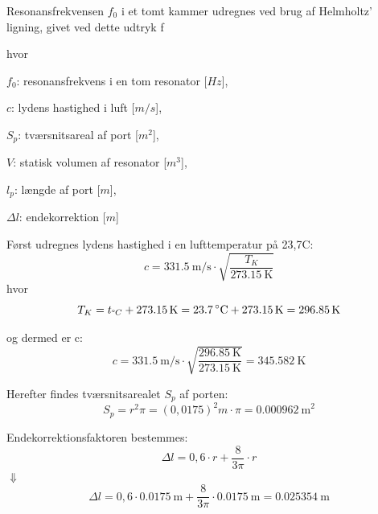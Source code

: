 {Resonansfrekvensen $f_{0}$ i et tomt kammer udregnes ved brug af Helmholtz' ligning, givet ved dette udtryk f

hvor 
\begin{description}[align=left,labelindent=0.3cm]
\item $f_{0}$: resonansfrekvens i en tom resonator [$Hz$],\\
\item $c$: lydens hastighed i luft [$m/s$],\\
\item $S_{p}$: tværsnitsareal af port [$m^2$],\\
\item $V$: statisk volumen af resonator [$m^3$],\\
\item $l_{p}$: længde af port [$m$],\\
\item $\Delta l$: endekorrektion [$m$]\\
\end{description}

Først udregnes lydens hastighed i en lufttemperatur på 23,7\degree C:
\begin{equation}
		c = {\SI{331,5}{\meter / \second}} \cdot \sqrt{\frac{T_{K}}{\SI{273,15}{\kelvin}}}	\end{equation}
 hvor 		
\begin{equation}
		T_{K} = t_{\degree C} + {\SI{273,15}{\kelvin}} = {\SI{23,7}{\degree C}} + {\SI{273,15}{\kelvin}} = {\SI{296,85}{\kelvin}}	
\end{equation}

og dermed er c: 
\begin{equation}
		c = {\SI{331,5}{\meter / \second}} \cdot \sqrt{\frac{\SI{296,85}{\kelvin}}{\SI{273,15}{\kelvin}}} = {\SI{345,582}{\kelvin}}	\end{equation}
		
Herefter findes tværsnitsarealet $S_{p}$ af porten:
\begin{equation}
		S_{p} = r^2\pi = (0,0175)^2 m \cdot \pi	= {\SI{0,000962}{\meter}^2}
\end{equation}

Endekorrektionsfaktoren bestemmes: 
\begin{equation}
		\Delta l = 0,6 \cdot r + \frac{8}{3\pi} \cdot r 
\end{equation} 
$\Downarrow$
\begin{equation}
\Delta l = 0,6 \cdot {\SI{0,0175}{\meter}} + \frac{8}{3\pi} \cdot {\SI{0,0175}{\meter}} = {\SI{0.025354}{\meter}} 
\end{equation}
		
}
